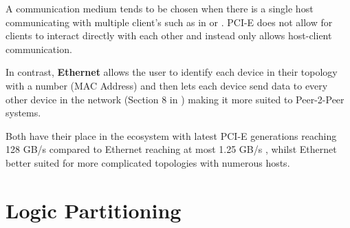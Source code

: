 A  communication medium tends to be chosen when there is a single host communicating with multiple client's such as in \cite{10.1145/3337821.3337846} or \cite{6927459}. PCI-E does not allow for clients to interact directly with each other and instead only allows host-client communication. 

In contrast, \textbf{Ethernet} allows the user to identify each device in their topology with a number (MAC Address) and then lets each device send data to every other device in the network (Section 8 in \cite{6847097}) making it more suited to Peer-2-Peer systems. 

Both have their place in the ecosystem with latest PCI-E generations reaching 128 GB/s \cite{pcie-speed} compared to Ethernet reaching at most 1.25 GB/s \cite{ether-speed}, whilst Ethernet better suited for more complicated topologies with numerous hosts.

\section{Logic Partitioning}

\subsec

